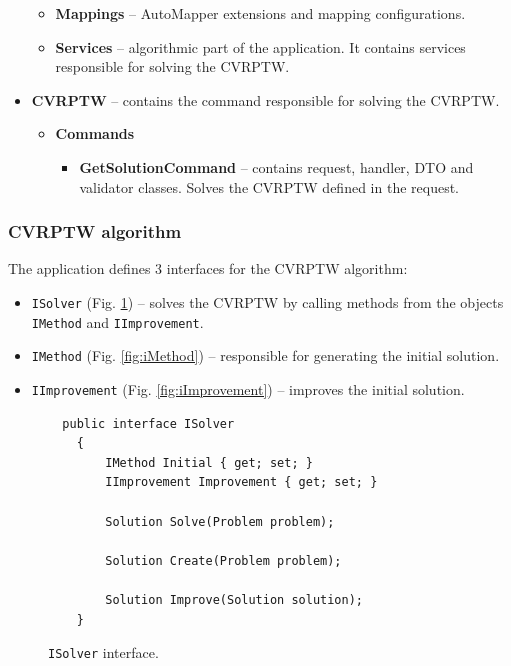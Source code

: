 \documentclass[a4paper,twoside,12pt]{book}
\begin{document}
\begin{itemize}
\begin{itemize}
        \item \textbf{Mappings} -- AutoMapper extensions and mapping configurations.
        \item \textbf{Services} -- algorithmic part of the application. It contains services responsible for solving the CVRPTW.
    \end{itemize}
\item \textbf{CVRPTW} -- contains the command responsible for solving the CVRPTW.
    \begin{itemize}
        \item \textbf{Commands}
        \begin{itemize}
        \item \textbf{GetSolutionCommand} -- contains request, handler, DTO and validator classes. Solves the CVRPTW defined in the request.
    \end{itemize}
    \end{itemize}
\end{itemize}

\subsubsection{CVRPTW algorithm}
The application defines 3 interfaces for the CVRPTW algorithm:
\begin{itemize}
    \item \lstinline{ISolver} (Fig. \ref{fig:iSolver}) -- solves the CVRPTW by calling methods from the objects \lstinline{IMethod} and \lstinline{IImprovement}.
    \item \lstinline{IMethod} (Fig. \ref{fig:iMethod}) -- responsible for generating the initial solution.
    \item \lstinline{IImprovement} (Fig. \ref{fig:iImprovement}) -- improves the initial solution.
\end{itemize}

\begin{figure}[htb]
\centering
\begin{lstlisting}
  public interface ISolver
    {
        IMethod Initial { get; set; }
        IImprovement Improvement { get; set; }

        Solution Solve(Problem problem);

        Solution Create(Problem problem);

        Solution Improve(Solution solution);
    }
\end{lstlisting}
\caption{\lstinline{ISolver} interface.}
\label{fig:iSolver}
\end{figure}
\end{document}
